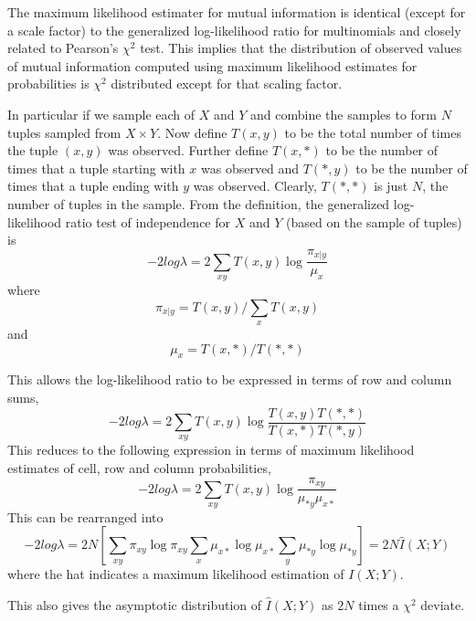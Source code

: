 \documentclass[12pt]{article}
\begin{document}
The maximum likelihood estimater for mutual information is identical (except for a scale factor) to the generalized log-likelihood ratio for multinomials and closely related to Pearson's 
$\chi^2$ test.  This implies that the distribution of observed values of mutual information computed using maximum likelihood estimates for probabilities is $\chi^2$ distributed except for that scaling factor.

In particular if we sample each of $X$ and $Y$ and combine the samples to form $N$ tuples sampled from $X \times Y$.  Now define $T(x, y)$ to be the total number of times the tuple $(x, y)$ was observed.  Further define $T(x, *)$ to be the number of times that a tuple starting with $x$ was observed and $T(*, y)$ to be the number of times that a tuple ending with $y$ was observed.  Clearly, $T(*, *)$ is just $N$, the number of tuples in the sample.  From the definition, the generalized log-likelihood ratio test of independence for $X$ and $Y$ (based on the sample of tuples) is 
\begin{equation*}
 -2 log \lambda = 
2 \sum_{xy} T(x,y) \log \frac {\pi_{x|y}} {\mu_x}
\end{equation*}
where 
\begin{equation*}
\pi_{x|y} = T(x,y) / \sum_x T(x,y)
\end{equation*}
and 
\begin{equation*}
\mu_x = T(x,*) / T(*, *)
\end{equation*}

This allows the log-likelihood ratio to be expressed in terms of row and column sums,
\begin{equation*}
 -2 log \lambda = 
2 \sum_{xy} T(x,y)
\log {\frac
    {T(x,y) T(*, *)}
    {T(x, *) T(*, y) }
}
\end{equation*}
This reduces to the following expression in terms of maximum likelihood estimates of cell, row and column probabilities,
\begin{equation*}
 -2 log \lambda = 
2 \sum_{xy} T(x,y)
\log {\frac
    {\pi_{xy}}
    { \mu_{*y} \mu_{x*} }
}
\end{equation*}
This can be rearranged into 
\begin{equation*}
 -2 log \lambda = 
2 N \left[
  \sum_{xy} \pi_{xy} \log \pi_{xy}
  \sum_{x} \mu_{x*} \log \mu_{x*}
  \sum_{y} \mu_{*y} \log \mu_{*y}
\right] = 2 N \hat I (X;Y)
\end{equation*}
where the hat indicates a maximum likelihood estimation of $I(X;Y)$.

This also gives the asymptotic distribution of $\hat I(X;Y)$ as $2N$ times a $\chi^2$ deviate.
\end{document}
